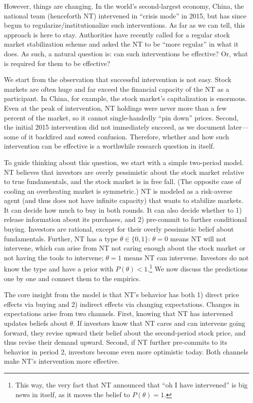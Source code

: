 \documentclass[12pt]{article}
\begin{document}
However, things are changing. In the world’s second-largest economy, China, the national team (henceforth NT) intervened in ``crisis mode'' in 2015, but has since begun to regularize/institutionalize such interventions. As far as we can tell, this approach is here to stay. Authorities have recently called for a regular stock market stabilization scheme and asked the NT to be ``more regular'' in what it does. As such, a natural question is: can such interventions be effective? Or, what is required for them to be effective?

We start from the observation that successful intervention is not easy. Stock markets are often huge and far exceed the financial capacity of the NT as a participant. In China, for example, the stock market’s capitalization is enormous. Even at the peak of intervention, NT holdings were never more than a few percent of the market, so it cannot single-handedly ``pin down'' prices. Second, the initial 2015 intervention did not immediately succeed, as we document later---some of it backfired and sowed confusion. Therefore, whether and how such intervention can be effective is a worthwhile research question in itself.

To guide thinking about this question, we start with a simple two-period model. NT believes that investors are overly pessimistic about the stock market relative to true fundamentals, and the stock market is in free fall. (The opposite case of cooling an overheating market is symmetric.) NT is modeled as a risk-averse agent (and thus does not have infinite capacity) that wants to stabilize markets. It can decide how much to buy in both rounds. It can also decide whether to 1) release information about its purchases, and 2) pre-commit to further conditional buying. Investors are rational, except for their overly pessimistic belief about fundamentals. Further, NT has a type $\theta \in \{0,1\}$: $\theta = 0$ means NT will not intervene, which can arise from NT not caring enough about the stock market or not having the tools to intervene; $\theta = 1$ means NT can intervene. Investors do not know the type and have a prior with $P(\theta) < 1$.\footnote{This way, the very fact that NT announced that ``oh I have intervened'' is big news in itself, as it moves the belief to $P(\theta) = 1$.} We now discuss the predictions one by one and connect them to the empirics.

The core insight from the model is that NT's behavior has both 1) direct price effects via buying and 2) indirect effects via changing expectations. Changes in expectations arise from two channels. First, knowing that NT has intervened updates beliefs about $\theta$. If investors know that NT cares and can intervene going forward, they revise upward their belief about the second-period stock price, and thus revise their demand upward. Second, if NT further pre-commits to its behavior in period 2, investors become even more optimistic today. Both channels make NT's intervention more effective.
\end{document}
